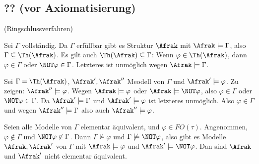 \subsection{?? (vor Axiomatisierung)}
(Ringschlussverfahren)\\
\begin{description}[style=nextline]
  \item[(1)$\IMPL$(2)]
  Sei $\Gamma$ vollständig. Da $\Gamma$ erfüllbar gibt es Struktur
  $\Afrak$ mit $\Afrak\models\Gamma$, also $\Gamma\subseteq\Th(\Afrak)$.
  Es gilt auch $\Th(\Afrak)\subseteq\Gamma$: Wenn $\varphi\in\Th(\Afrak)$,
  dann $\varphi\in\Gamma$ oder $\NOT\varphi\in\Gamma$. Letzteres ist
  unmöglich wegen $\Afrak\models\Gamma$.
  
  \item[(2)$\IMPL$(3)]
  Sei $\Gamma=\Th(\Afrak)$, $\Afrak', \Afrak''$ Meodell von $\Gamma$ und
  $\Afrak'\models\varphi$. Zu zeigen: $\Afrak''\models\varphi$. Wegen
  $\Afrak\models\varphi$ oder $\Afrak\models\NOT\varphi$, also
  $\varphi\in\Gamma$ oder $\NOT\varphi\in\Gamma$. Da $\Afrak'\models\Gamma$
  und $\Afrak'\models\varphi$ ist letzteres unmöglich. Also $\varphi\in\Gamma$
  und wegen $\Afrak''\models\Gamma$ also auch $\Afrak''\models\varphi$.
  
  \item[(3)$\IMPL$(1)]
  Seien alle Modelle von $\Gamma$ elementar äquivalent, und $\varphi\in
  FO(\tau)$. Angenommen, $\varphi\not\in\Gamma$ und $\NOT\varphi\not\in\Gamma$.
  Dann $\Gamma\not\models\varphi$ und $\Gamma\not\models\NOT\varphi$, also
  gibt es Modelle $\Afrak, \Afrak'$ von $\Gamma$ mit $\Afrak\models\varphi$
  und $\Afrak'\models\NOT\varphi$. Dan sind $\Afrak$ und $\Afrak'$ nicht
  elementar äquivalent.
\end{description}

